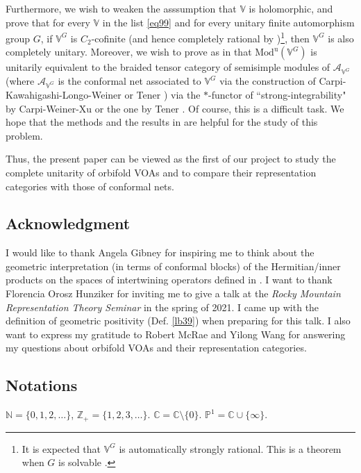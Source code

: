 \documentclass[11pt,b5paper,notitlepage]{article}
\theoremstyle{definition}
\theoremstyle{plain}
\newcommand{\mc}{\mathcal}
\newcommand{\uni}{\mathrm{u}}
\newcommand{\Vbb}{\mathbb V}
\newcommand{\Cbb}{\mathbb C}
\newcommand{\Nbb}{\mathbb N}
\newcommand{\Zbb}{\mathbb Z}
\newcommand{\Pbb}{\mathbb P}
\newcommand{\Mod}{\mathrm{Mod}}
\numberwithin{equation}{section}
\begin{document}
Furthermore, we wish to weaken the asssumption that $\Vbb$ is holomorphic, and prove that for every $\Vbb$ in the list \eqref{eq99} and for every unitary finite automorphism group $G$, if $\Vbb^G$ is $C_2$-cofinite (and hence completely rational by \cite{McR21})\footnote{It is expected that $\Vbb^G$ is automatically strongly rational. This is a theorem when $G$ is solvable \cite{Miy15,CM16}.}, then $\Vbb^G$ is also completely unitary. Moreover, we wish to prove as in \cite{Gui20} that $\Mod^\uni(\Vbb^G)$ is unitarily equivalent to the braided tensor category of semisimple modules of $\mc A_{\Vbb^G}$ (where $\mc A_{\Vbb^G}$ is the conformal net associated to $\Vbb^G$ via the construction of Carpi-Kawahigashi-Longo-Weiner \cite{CKLW18} or Tener \cite{Ten19a}) via the $*$-functor of ``strong-integrability" by Carpi-Weiner-Xu \cite{CWX} or the one by Tener \cite{Ten19b}. Of course, this is a difficult task. We hope that the methods and the results in \cite{Gui19c,Ten19c,Gui20,CGGH23,CT23} are helpful for the study of this problem.

Thus, the present paper can be viewed as the first of our project to study the complete unitarity of orbifold VOAs and to compare their representation categories with those of conformal nets.





\subsection*{Acknowledgment}

I would like to thank Angela Gibney for inspiring me to think about the geometric interpretation (in terms of conformal blocks) of the Hermitian/inner products on the spaces of intertwining operators defined in \cite{Gui19b}. I want to thank Florencia Orosz Hunziker for inviting me to give a talk at the \textit{Rocky Mountain Representation Theory Seminar} in the spring of 2021. I came up with the definition of geometric positivity (Def. \ref{lb39}) when preparing for this talk.  I also want to express my gratitude to Robert McRae and Yilong Wang for answering my questions about orbifold VOAs and their representation categories. 







\subsection*{Notations}
$\Nbb=\{0,1,2,\dots\}$, $\Zbb_+=\{1,2,3,\dots\}$. $\Cbb=\Cbb\setminus\{0\}$. $\Pbb^1=\Cbb\cup\{\infty\}$.
\end{document}
